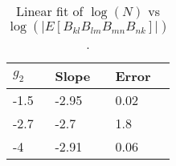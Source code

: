 \documentclass[12pt,a4paper]{article}
\begin{document}
\begin{table}[hp]
\centering
\begin{tabular}{|l|l|l|}
\hline
$g_2$ & Slope & Error \\ \hline
-1.5 & -2.95 & 0.02 \\ \hline
-2.7 & -2.7 & 1.8 \\ \hline
-4 & -2.91 & 0.06 \\ \hline
\end{tabular}
\caption{Linear fit of $\log(N)$ vs $\log(|E[ B_{kl} B_{lm} B_{mn} B_{nk} ]|)$.}
\label{tab:N4Bexp}
\end{table}
\end{document}
